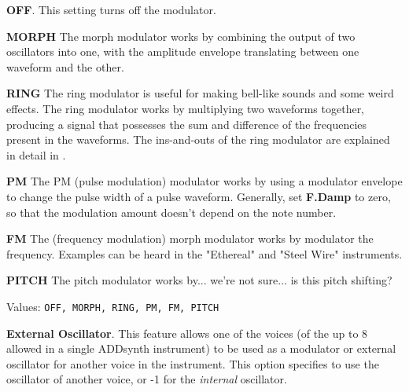   \begin{enumber}
      \item \textbf{OFF}.
         This setting turns off the modulator.
      \item \textbf{MORPH}
         The morph modulator works by combining the output of two oscillators
         into one, with the amplitude envelope translating between one waveform
         and the other.
      \item \textbf{RING}
         The ring modulator is useful for making bell-like sounds and some
         weird effects.  The ring modulator works by multiplying two
         waveforms together, producing a signal that possesses the sum and
         difference of the frequencies present in the waveforms.  The
         ins-and-outs of the ring modulator are explained in detail in
         .
      \item \textbf{PM}
         The PM (pulse modulation) modulator works by using a modulator
         envelope to change the pulse width of a pulse waveform.
         Generally, set \textbf{F.Damp} to zero, so that the modulation amount
         doesn't depend on the note number.
      \item \textbf{FM}
         The (frequency modulation) morph modulator works by modulator the
         frequency.  Examples can be heard in the "Ethereal" and "Steel Wire"
         instruments.
      \item \textbf{PITCH}
         The pitch modulator works by...
         we're not sure... is this pitch shifting?
   \end{enumber}

   Values: \texttt{OFF, MORPH, RING, PM, FM, PITCH}


   \textbf{External Oscillator}.
   This feature allows one of the voices (of the up to 8 allowed in a single
   ADDsynth instrument) to be used as a modulator or external oscillator for
   another voice in the instrument.
   This option specifies to use the oscillator of another voice, or
   -1 for the \textsl{internal} oscillator.

